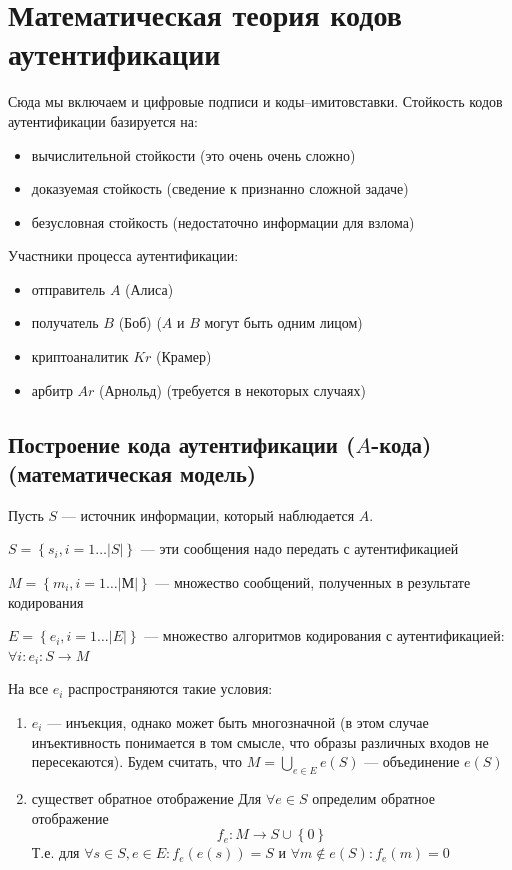 \chapter[Математическая теория кодов аутентификации]{Математическая
теория кодов аутентификации}
Сюда мы включаем и цифровые подписи и коды–имитовставки.
Стойкость кодов аутентификации базируется на:

\begin{itemize}
\item вычислительной стойкости (это очень очень сложно)
\item доказуемая стойкость (сведение к признанно сложной задаче)
\item безусловная стойкость (недостаточно информации для взлома)
\end{itemize}
Участники процесса аутентификации:

\begin{itemize}
\item отправитель $A$ (Алиса)
\item получатель $B$ (Боб) ($A$ и $B$ могут быть одним лицом)
\item криптоаналитик $Kr$ (Крамер) 
\item арбитр $Ar$ (Арнольд) (требуется в некоторых случаях)
\end{itemize}
\section{Построение кода аутентификации ($A$-кода)
(математическая модель)}

Пусть $S$ --- источник информации, который наблюдается $A$.

$S=\left\{{s}_{i},i=1{\dots}\left|S\right|\right\}$  --–  эти сообщения
надо передать с аутентификацией

$M=\left\{{m}_{i},i=1{\dots}\left|\text{М}\right|\right\}$ –-- множество
сообщений, полученных в результате кодирования

$E=\left\{{e}_{i},i=1{\dots}\left|E\right|\right\}$ --– множество
алгоритмов кодирования с аутентификацией: 
${\forall}i:{e}_{i}:S\rightarrow M$

На все  ${e}_{i}$ распространяются такие условия:
\begin{enumerate}
\item\label{it:properties:e:inj}
  ${e}_{i}$ --- инъекция, однако может быть многозначной (в этом
  случае инъективность понимается в том смысле, что образы различных
  входов не пересекаются).
  Будем считать, что  $M=\bigcup\limits_{e \in E} e\left( S \right)$
  --– объединение $e\left( S \right)$
\item\label{it:properties:e:inv}
  существет обратное отображение
Для  ${\forall}e \in S$ определим обратное отображение
\begin{equation*}
  {f}_{e}:M\rightarrow S \cup \left\{ 0 \right\}
\end{equation*}
Т.е. для 
${\forall}s \in S,e \in E:{f}_{e}\left(e\left(s\right)\right)=S$
и  ${\forall}m{\notin}e(S):{f}_{e}\left(m\right)=0$
\end{enumerate}


